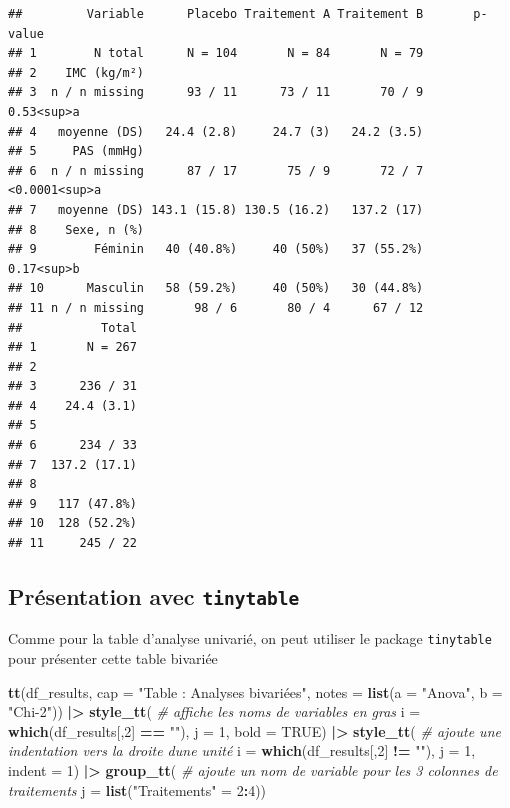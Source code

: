 \documentclass[
]{book}
\newenvironment{Shaded}{\begin{snugshade}}{\end{snugshade}}
\newcommand{\AttributeTok}[1]{\textcolor[rgb]{0.13,0.29,0.53}{#1}}
\newcommand{\CommentTok}[1]{\textcolor[rgb]{0.56,0.35,0.01}{\textit{#1}}}
\newcommand{\ConstantTok}[1]{\textcolor[rgb]{0.56,0.35,0.01}{#1}}
\newcommand{\DecValTok}[1]{\textcolor[rgb]{0.00,0.00,0.81}{#1}}
\newcommand{\FunctionTok}[1]{\textcolor[rgb]{0.13,0.29,0.53}{\textbf{#1}}}
\newcommand{\NormalTok}[1]{#1}
\newcommand{\OtherTok}[1]{\textcolor[rgb]{0.56,0.35,0.01}{#1}}
\newcommand{\SpecialCharTok}[1]{\textcolor[rgb]{0.81,0.36,0.00}{\textbf{#1}}}
\newcommand{\StringTok}[1]{\textcolor[rgb]{0.31,0.60,0.02}{#1}}
\begin{document}
\begin{verbatim}
##         Variable      Placebo Traitement A Traitement B       p-value
## 1        N total      N = 104       N = 84       N = 79              
## 2    IMC (kg/m²)                                                     
## 3  n / n missing      93 / 11      73 / 11       70 / 9    0.53<sup>a
## 4   moyenne (DS)   24.4 (2.8)     24.7 (3)   24.2 (3.5)              
## 5     PAS (mmHg)                                                     
## 6  n / n missing      87 / 17       75 / 9       72 / 7 <0.0001<sup>a
## 7   moyenne (DS) 143.1 (15.8) 130.5 (16.2)   137.2 (17)              
## 8    Sexe, n (%)                                                     
## 9        Féminin   40 (40.8%)     40 (50%)   37 (55.2%)    0.17<sup>b
## 10      Masculin   58 (59.2%)     40 (50%)   30 (44.8%)              
## 11 n / n missing       98 / 6       80 / 4      67 / 12              
##           Total
## 1       N = 267
## 2              
## 3      236 / 31
## 4    24.4 (3.1)
## 5              
## 6      234 / 33
## 7  137.2 (17.1)
## 8              
## 9   117 (47.8%)
## 10  128 (52.2%)
## 11     245 / 22
\end{verbatim}

\subsection{\texorpdfstring{Présentation avec \texttt{tinytable}}{Présentation avec tinytable}}\label{pruxe9sentation-avec-tinytable}

Comme pour la table d'analyse univarié, on peut utiliser le package \texttt{tinytable} pour présenter cette table bivariée

\begin{Shaded}
\begin{Highlighting}[]
\FunctionTok{tt}\NormalTok{(df\_results, }
   \AttributeTok{cap =} \StringTok{"Table : Analyses bivariées"}\NormalTok{, }
   \AttributeTok{notes =} \FunctionTok{list}\NormalTok{(}\AttributeTok{a =} \StringTok{"Anova"}\NormalTok{, }\AttributeTok{b =} \StringTok{"Chi{-}2"}\NormalTok{)) }\SpecialCharTok{|\textgreater{}}
  \FunctionTok{style\_tt}\NormalTok{( }\CommentTok{\# affiche les noms de variables en gras}
    \AttributeTok{i =} \FunctionTok{which}\NormalTok{(df\_results[,}\DecValTok{2}\NormalTok{] }\SpecialCharTok{==} \StringTok{""}\NormalTok{),}
    \AttributeTok{j =} \DecValTok{1}\NormalTok{,}
    \AttributeTok{bold =} \ConstantTok{TRUE}\NormalTok{) }\SpecialCharTok{|\textgreater{}} 
  \FunctionTok{style\_tt}\NormalTok{( }\CommentTok{\# ajoute une indentation vers la droite d\textquotesingle{}une unité}
    \AttributeTok{i =} \FunctionTok{which}\NormalTok{(df\_results[,}\DecValTok{2}\NormalTok{] }\SpecialCharTok{!=} \StringTok{""}\NormalTok{), }
    \AttributeTok{j =} \DecValTok{1}\NormalTok{,}
    \AttributeTok{indent =} \DecValTok{1}\NormalTok{) }\SpecialCharTok{|\textgreater{}}
  \FunctionTok{group\_tt}\NormalTok{( }\CommentTok{\# ajoute un nom de variable pour les 3 colonnes de traitements}
    \AttributeTok{j =} \FunctionTok{list}\NormalTok{(}\StringTok{"Traitements"} \OtherTok{=} \DecValTok{2}\SpecialCharTok{:}\DecValTok{4}\NormalTok{))}
\end{Highlighting}
\end{Shaded}
\end{document}
